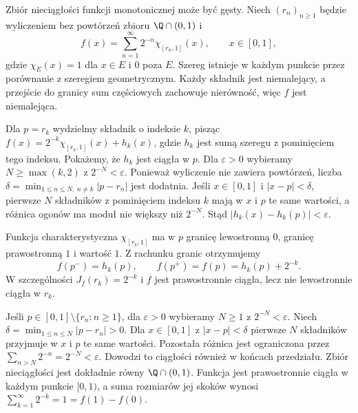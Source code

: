 \begin{przyklad}
\label{ma1:ex:dense-monotone-jumps}
Zbiór nieciągłości funkcji monotonicznej może być gęsty. Niech $(r_n)_{n\ge1}$ będzie wyliczeniem bez powtórzeń zbioru $\Q\cap(0,1)$ i
\[
 f(x)=\sum_{n=1}^\infty 2^{-n}\chi_{[r_n,1]}(x),
 \qquad x\in[0,1],
\]
gdzie $\chi_E(x)=1$ dla $x\in E$ i $0$ poza $E$. Szereg istnieje w każdym punkcie przez porównanie z szeregiem geometrycznym. Każdy składnik jest niemalejący, a przejście do granicy sum częściowych zachowuje nierówność, więc $f$ jest niemalejąca.

Dla $p=r_k$ wydzielmy składnik o indeksie $k$, pisząc $f(x)=2^{-k}\chi_{[r_k,1]}(x)+h_k(x)$, gdzie $h_k$ jest sumą szeregu z pominięciem tego indeksu. Pokażemy, że $h_k$ jest ciągła w $p$. Dla $\varepsilon>0$ wybieramy $N\ge\max(k,2)$ z $2^{-N}<\varepsilon$. Ponieważ wyliczenie nie zawiera powtórzeń, liczba $\delta=\min_{1\le n\le N,\ n\ne k}|p-r_n|$ jest dodatnia. Jeśli $x\in[0,1]$ i $|x-p|<\delta$, pierwsze $N$ składników z pominięciem indeksu $k$ mają w $x$ i $p$ te same wartości, a różnica ogonów ma moduł nie większy niż $2^{-N}$. Stąd $|h_k(x)-h_k(p)|<\varepsilon$.

Funkcja charakterystyczna $\chi_{[r_k,1]}$ ma w $p$ granicę lewostronną $0$, granicę prawostronną $1$ i wartość $1$. Z rachunku granic otrzymujemy
\[
 f(p^-)=h_k(p),\qquad f(p^+)=f(p)=h_k(p)+2^{-k}.
\]
W szczególności $J_f(r_k)=2^{-k}$ i $f$ jest prawostronnie ciągła, lecz nie lewostronnie ciągła w $r_k$.

Jeśli $p\in[0,1]\setminus\{r_n:n\ge1\}$, dla $\varepsilon>0$ wybieramy $N\ge1$ z $2^{-N}<\varepsilon$. Niech $\delta=\min_{1\le n\le N}|p-r_n|>0$. Dla $x\in[0,1]$ z $|x-p|<\delta$ pierwsze $N$ składników przyjmuje w $x$ i $p$ te same wartości. Pozostała różnica jest ograniczona przez $\sum_{n>N}2^{-n}=2^{-N}<\varepsilon$. Dowodzi to ciągłości również w końcach przedziału. Zbiór nieciągłości jest dokładnie równy $\Q\cap(0,1)$. Funkcja jest prawostronnie ciągła w każdym punkcie $[0,1)$, a suma rozmiarów jej skoków wynosi $\sum_{k=1}^{\infty}2^{-k}=1=f(1)-f(0)$.
\end{przyklad}

